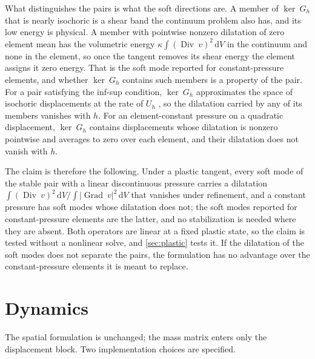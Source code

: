 \documentclass{article}
\newcommand{\Grad}{\operatorname{Grad}}
\newcommand{\Div}{\operatorname{Div}}
\newcommand{\diff}{\,\mathrm{d}}
\theoremstyle{definition}
\theoremstyle{plain}
\begin{document}
What distinguishes the pairs is what the soft directions are. A member of
$\ker ~G_h$ that is nearly isochoric is a shear band the continuum problem
also has, and its low energy is physical. A member with pointwise nonzero
dilatation of zero element mean has the volumetric energy
$\kappa \int (\Div ~v)^2 \diff V$ in the continuum and none in the element,
so once the tangent removes its shear energy the element assigns it zero
energy. That is the soft
mode reported for constant-pressure elements, and whether $\ker ~G_h$
contains such members is a property of the pair. For a pair satisfying the
inf-sup condition, $\ker ~G_h$ approximates the space of isochoric
displacements at the rate of $U_h$ \cite[Prop.~5.1.3]{BoffiBrezziFortin:2013},
so the dilatation carried by any of its members vanishes with $h$. For an
element-constant pressure on a quadratic displacement, $\ker ~G_h$ contains
displacements whose dilatation is nonzero pointwise and averages to zero over
each element, and their dilatation does not vanish with $h$.

The claim is therefore the following. Under a plastic tangent, every
soft mode of the stable pair with a linear discontinuous pressure carries a
dilatation $\int (\Div ~v)^2 \diff V / \int \lvert\Grad ~v\rvert^2 \diff V$
that vanishes under refinement, and a constant pressure has soft modes whose
dilatation does not; the soft modes reported for constant-pressure elements
are the latter, and no stabilization is needed where they are absent. Both operators are linear at a fixed plastic state,
so the claim is tested without a nonlinear solve, and \cref{sec:plastic}
tests it. If the dilatation of the soft modes does not separate the pairs,
the formulation has no advantage over the constant-pressure elements it is
meant to replace.

\section{Dynamics}
\label{sec:dynamics}

The spatial formulation is unchanged; the mass matrix enters only the
displacement block. Two implementation choices are specified.
\end{document}

